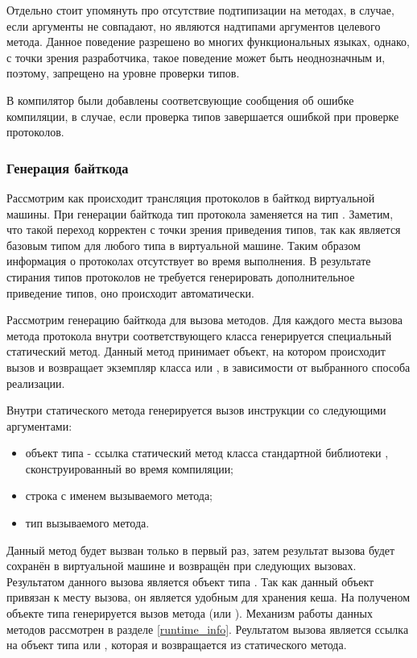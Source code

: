 Отдельно стоит упомянуть про отсутствие подтипизации на методах, в случае, если аргументы не совпадают, но являются надтипами аргументов целевого метода. Данное поведение разрешено во многих функциональных языках, однако, с точки зрения разработчика, такое поведение может быть неоднозначным и, поэтому, запрещено на уровне проверки типов.

В компилятор были добавлены соответсвующие сообщения об ошибке компиляции, в случае, если проверка типов завершается ошибкой при проверке протоколов.

\subsubsection{Генерация байткода}
Рассмотрим как происходит трансляция протоколов в байткод виртуальной машины. При генерации байткода тип протокола заменяется на тип . Заметим, что такой переход корректен с точки зрения приведения типов, так как  является базовым типом для любого типа в виртуальной машине. Таким образом информация о протоколах отсутствует во время выполнения. В результате стирания типов протоколов не требуется генерировать дополнительное приведение типов, оно происходит автоматически.

Рассмотрим генерацию байткода для вызова методов. Для каждого места вызова метода протокола внутри соответствующего класса генерируется специальный статический метод. Данный метод принимает объект, на котором происходит вызов и возвращает экземпляр класса  или , в зависимости от выбранного способа реализации.

Внутри статического метода генерируется вызов инструкции  со следующими аргументами:
\begin{itemize}
  \item объект типа  - ссылка статический метод  класса стандартной библиотеки , сконструированный во время компиляции;
  \item строка с именем вызываемого метода;
  \item тип вызываемого метода.
\end{itemize}

Данный метод будет вызван только в первый раз, затем результат вызова будет сохранён в виртуальной машине и возвращён при следующих вызовах. Результатом данного вызова является объект типа . Так как данный объект привязан к месту вызова, он является удобным для хранения кеша. На полученом объекте типа  генерируется вызов метода (или ). Механизм работы данных методов рассмотрен в разделе \ref{runtime_info}. Реультатом вызова является ссылка на объект типа  или , которая и возвращается из статического метода.

